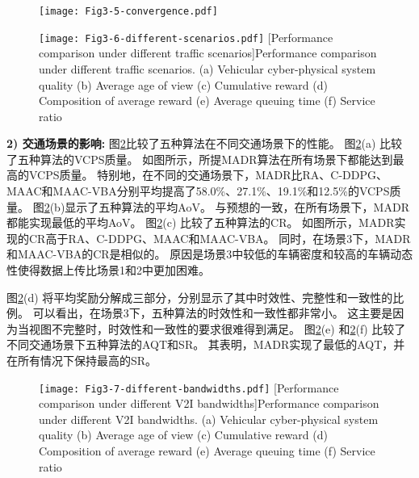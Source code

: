 \begin{figure}[h]
\centering
  \texttt{[image: Fig3-5-convergence.pdf]}
  \label{fig 2-6}
\end{figure} 

\begin{figure}[h]
  \centering
  \texttt{[image: Fig3-6-different-scenarios.pdf]}
  [Performance comparison under different traffic scenarios]{Performance comparison under different traffic scenarios. (a) Vehicular cyber-physical system quality (b) Average age of view (c) Cumulative reward (d) Composition of average reward (e) Average queuing time (f) Service ratio}
  \label{fig 2-7}
\end{figure}

\textbf{2) 交通场景的影响:}
图\ref{fig 2-7}比较了五种算法在不同交通场景下的性能。
图\ref{fig 2-7}(a) 比较了五种算法的VCPS质量。
如图所示，所提MADR算法在所有场景下都能达到最高的VCPS质量。
特别地，在不同的交通场景下，MADR比RA、C-DDPG、MAAC和MAAC-VBA分别平均提高了58.0\%、27.1\%、19.1\%和12.5\%的VCPS质量。
图\ref{fig 2-7}(b)显示了五种算法的平均AoV。
与预想的一致，在所有场景下，MADR都能实现最低的平均AoV。
图\ref{fig 2-7}(c) 比较了五种算法的CR。
如图所示，MADR实现的CR高于RA、C-DDPG、MAAC和MAAC-VBA。
同时，在场景3下，MADR和MAAC-VBA的CR是相似的。
原因是场景3中较低的车辆密度和较高的车辆动态性使得数据上传比场景1和2中更加困难。

图\ref{fig 2-7}(d) 将平均奖励分解成三部分，分别显示了其中时效性、完整性和一致性的比例。
可以看出，在场景3下，五种算法的时效性和一致性都非常小。
这主要是因为当视图不完整时，时效性和一致性的要求很难得到满足。
图\ref{fig 2-7}(e) 和\ref{fig 2-7}(f) 比较了不同交通场景下五种算法的AQT和SR。
其表明，MADR实现了最低的AQT，并在所有情况下保持最高的SR。

\begin{figure}[h]
  \centering
  \texttt{[image: Fig3-7-different-bandwidths.pdf]}
  [Performance comparison under different V2I bandwidths]{Performance comparison under different V2I bandwidths. (a) Vehicular cyber-physical system quality (b) Average age of view (c) Cumulative reward (d) Composition of average reward (e) Average queuing time (f) Service ratio}
  \label{fig 2-8}
\end{figure}

